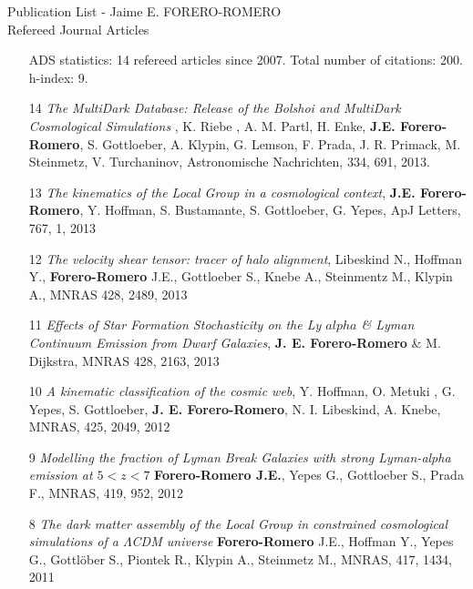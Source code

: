 \documentclass[9pt]{article}
\begin{document}
\noindent

\noindent
{{\Large Publication List - Jaime E. FORERO-ROMERO}}\\

\indent
Refereed Journal Articles
\begin{enumerate}
\item[] ADS statistics: 14 refereed articles since 2007. Total number of citations: 200. h-index: 9.
\item[14]{\it The MultiDark Database: Release of the Bolshoi and MultiDark Cosmological Simulations} , K. Riebe , A. M. Partl, H. Enke, {\bf J.E. Forero-Romero}, S. Gottloeber, A. Klypin, G. Lemson, F. Prada, J. R. Primack, M. Steinmetz, V. Turchaninov, Astronomische Nachrichten, 334, 691, 2013.

\item[13] {\it The kinematics of the Local Group in a cosmological context}, 
{\bf J.E. Forero-Romero}, Y. Hoffman, S. Bustamante, S. Gottloeber, G. Yepes, ApJ Letters, 767, 1, 2013

\item[12] {\it The velocity shear tensor: tracer of halo alignment}, Libeskind N., Hoffman Y., {\bf Forero-Romero} J.E., Gottloeber S., Knebe A., Steinmentz M., Klypin A., MNRAS 428, 2489, 2013

\item[11] {\it Effects of Star Formation Stochasticity on the Ly $alpha$ \& Lyman Continuum Emission from Dwarf Galaxies}, {\bf J. E. Forero-Romero} \& M. Dijkstra, MNRAS 428, 2163, 2013

\item[10] {\it A kinematic classification of the cosmic web}, Y. Hoffman, O. Metuki , G. Yepes, S. Gottloeber, {\bf J. E. Forero-Romero}, N. I. Libeskind, A. Knebe, MNRAS, 425, 2049, 2012

\item[9] {\it Modelling the fraction of Lyman Break Galaxies with strong Lyman-alpha emission at $5 < z < 7$} {\bf Forero-Romero J.E.}, Yepes G., Gottloeber S., Prada F., MNRAS, 419, 952, 2012

\item [8]
{\it The dark matter assembly of the Local Group in constrained cosmological
  simulations of a $\Lambda$CDM universe} {\bf Forero-Romero} J.E., Hoffman Y., Yepes G., Gottl\"ober S.,
  Piontek R., Klypin A., Steinmetz M., 
MNRAS, 417, 1434, 2011


\end{enumerate}
\end{document}
